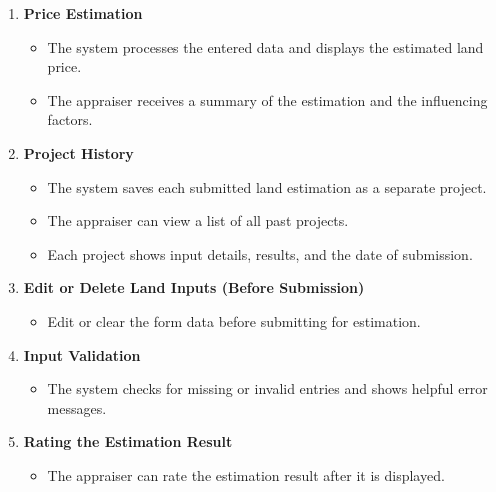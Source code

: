 \documentclass[12pt,oneside]{report}
\begin{document}
\begin{enumerate}[leftmargin=*,label=\arabic*.,align=left]
  \item \textbf{Price Estimation}
  \begin{itemize}[leftmargin=1.2em]
    \item The system processes the entered data and displays the estimated land price.
    \item The appraiser receives a summary of the estimation and the influencing factors.
  \end{itemize}

  \item \textbf{Project History}
  \begin{itemize}[leftmargin=1.2em]
    \item The system saves each submitted land estimation as a separate project.
    \item The appraiser can view a list of all past projects.
    \item Each project shows input details, results, and the date of submission.
  \end{itemize}

  \item \textbf{Edit or Delete Land Inputs (Before Submission)}
  \begin{itemize}[leftmargin=1.2em]
    \item Edit or clear the form data before submitting for estimation.
  \end{itemize}

  \item \textbf{Input Validation}
  \begin{itemize}[leftmargin=1.2em]
    \item The system checks for missing or invalid entries and shows helpful error messages.
  \end{itemize}

  \item \textbf{Rating the Estimation Result}
  \begin{itemize}[leftmargin=1.2em]
    \item The appraiser can rate the estimation result after it is displayed.
  \end{itemize}
\end{enumerate}
\end{document}
